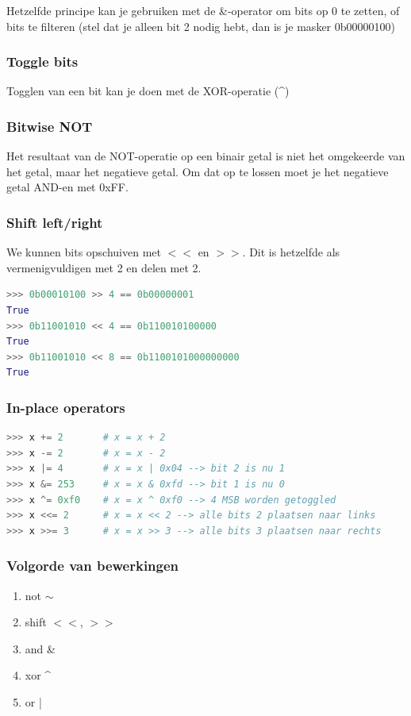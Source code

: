 \documentclass{article}
\begin{document}
Hetzelfde principe kan je gebruiken met de \&-operator om bits op 0 te zetten,
of bits te filteren (stel dat je alleen bit 2 nodig hebt, dan is je masker 0b00000100)

\subsubsection{Toggle bits}
Togglen van een bit kan je doen met de XOR-operatie (\textasciicircum{})

\subsubsection{Bitwise NOT}
Het resultaat van de NOT-operatie op een binair getal is niet het omgekeerde van het getal, 
maar het negatieve getal. Om dat op te lossen moet je het negatieve getal AND-en met 0xFF.

\subsubsection{Shift left/right}
We kunnen bits opschuiven met $<<$ en $>>$. Dit is hetzelfde als vermenigvuldigen met 2 en delen met 2.

\begin{lstlisting}[language=Python]
>>> 0b00010100 >> 4 == 0b00000001
True
>>> 0b11001010 << 4 == 0b110010100000
True
>>> 0b11001010 << 8 == 0b1100101000000000
True
\end{lstlisting}

\subsubsection{In-place operators}
\begin{lstlisting}[language=Python]
>>> x += 2       # x = x + 2
>>> x -= 2       # x = x - 2
>>> x |= 4       # x = x | 0x04 --> bit 2 is nu 1
>>> x &= 253     # x = x & 0xfd --> bit 1 is nu 0
>>> x ^= 0xf0    # x = x ^ 0xf0 --> 4 MSB worden getoggled
>>> x <<= 2      # x = x << 2 --> alle bits 2 plaatsen naar links
>>> x >>= 3      # x = x >> 3 --> alle bits 3 plaatsen naar rechts
\end{lstlisting}

\subsubsection{Volgorde van bewerkingen}
\begin{enumerate}
    \item not $\sim$
    \item shift $<<$, $>>$
    \item and \&
    \item xor \textasciicircum{}
    \item or |
\end{enumerate}
\end{document}
